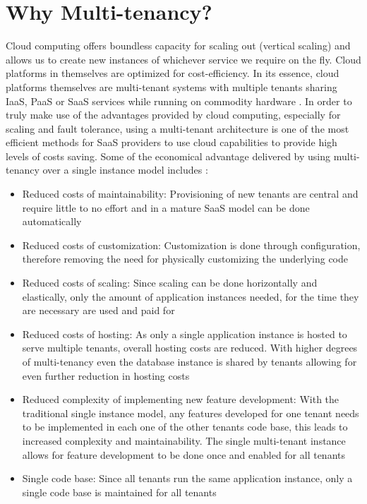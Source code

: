 \section{Why Multi-tenancy?}

Cloud computing offers boundless capacity for scaling out (vertical scaling) and allows us to create new instances of whichever service we require on the fly. Cloud platforms in themselves are optimized for cost-efficiency. In its essence, cloud platforms themselves are multi-tenant systems with multiple tenants sharing IaaS, PaaS or SaaS services while running on commodity hardware \cite{Wilder2012-so}. In order to truly make use of the advantages provided by cloud computing, especially for scaling and fault tolerance, using a multi-tenant architecture is one of the most efficient methods for SaaS providers to use cloud capabilities to provide high levels of costs saving.
Some of the economical advantage delivered by using multi-tenancy over a single instance model includes \cite{Betts2012-ad}:
\begin{itemize}
\item Reduced costs of maintainability: Provisioning of new tenants are central and require little to no effort and in a mature SaaS model can be done automatically
\item Reduced costs of customization: Customization is done through configuration, therefore removing the need for physically customizing the underlying code
\item Reduced costs of scaling: Since scaling can be done horizontally and elastically, only the amount of application instances needed, for the time they are necessary are used and paid for
\item Reduced costs of hosting: As only a single application instance is hosted to serve multiple tenants, overall hosting costs are reduced. With higher degrees of multi-tenancy even the database instance is shared by tenants allowing for even further reduction in hosting costs
\item Reduced complexity of implementing new feature development: With the traditional single instance model, any features developed for one tenant needs to be implemented in each one of the other tenants code base, this leads to increased complexity and maintainability. The single multi-tenant instance allows for feature development to be done once and enabled for all tenants
\item Single code base: Since all tenants run the same application instance, only a single code base is maintained for all tenants
\end{itemize}

